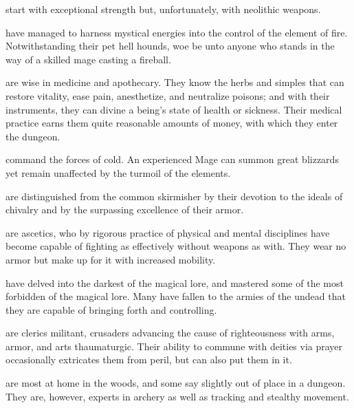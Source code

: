 \item[\bb{Cavemen {\rm and }Cavewomen}]%
start with exceptional strength but,
unfortunately, with neolithic weapons.

\item[\bb{Flame Mages}]%
have managed to harness mystical energies into the control
of the element of fire.  Notwithstanding their pet hell hounds,  woe be unto
anyone who stands in the way of a skilled mage casting a fireball.

\item[\bb{Healers}]%
are wise in medicine and apothecary.  They know the
herbs and simples that can restore vitality, ease pain, anesthetize,
and neutralize poisons; and with their instruments, they can divine a
being's state of health or sickness.  Their medical practice earns them
quite reasonable amounts of money, with which they enter the dungeon.

\item[\bb{Ice Mages}]%
command the forces of cold.  An experienced Mage can
summon great blizzards yet remain unaffected by the turmoil of the elements.

\item[\bb{Knights}]%
are distinguished from the common skirmisher by their
devotion to the ideals of chivalry and by the surpassing excellence of
their armor.

\item[\bb{Monks}]%
are ascetics, who by rigorous practice of physical and mental
disciplines have become capable of fighting as effectively without weapons
as with.  They wear no armor but make up for it with increased mobility.

\item[\bb{Necromancers}]%
have delved into the darkest of the magical lore, and
mastered some of the most forbidden of the magical lore.  Many have fallen
to the armies of the undead that they are capable of bringing forth and
controlling.

\item[\bb{Priests {\rm and }Priestesses}]%
are clerics militant, crusaders
advancing the cause of righteousness with arms, armor, and arts
thaumaturgic.  Their ability to commune with deities via prayer
occasionally extricates them from peril, but can also put them in it.

\item[\bb{Rangers}]%
are most at home in the woods, and some say slightly out
of place in a dungeon.  They are, however, experts in archery as well
as tracking and stealthy movement.

